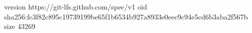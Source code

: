 version https://git-lfs.github.com/spec/v1
oid sha256:fc3f82c895c19739199be65f1b6534b927a8933e0eec9c94e5cd6b3aba2f567b
size 43269
